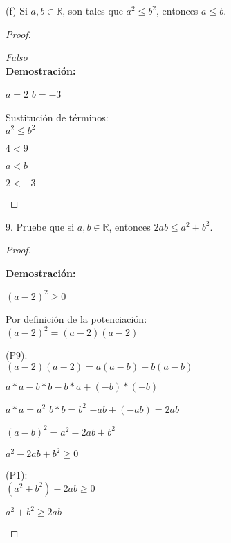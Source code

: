 \documentclass[12pt, a4paper]{article}
\begin{document}
(f) Si $a,b \in \mathbb{R}$, son tales que $a^2 \leq b^2$, entonces $a \leq b$.
    \begin{proof}
        \begin{center}
            \textit{Falso}\\
            \textbf{Demostración:}

            $a = 2$ $b = -3$

            Sustitución de términos:\\
            $a^2 \leq b^2$

            $4<9$

            $a<b$  
            
            $2<-3$

        \end{center}
    \end{proof}
9. Pruebe que si $a,b \in \mathbb{R}$, entonces $2ab \leq a^2 + b^2$.
    \begin{proof}
        \begin{center}
            \textbf{Demostración:}

            $(a-2)^2\geq0$

            Por definición de la potenciación:\\
            $(a-2)^2=(a-2)(a-2)$

            (P9):\\
            $(a-2)(a-2)=a(a-b)-b(a-b)$

            $a*a-b*b-b*a+(-b)*(-b)$

            $a*a=a^2$ $b*b=b^2$ $-ab+(-ab)=2ab$

            ${(a-b)}^2=a^2-2ab+b^2$

            $a^2-2ab+b^2\geq0$

            (P1):\\

            $(a^2+b^2)-2ab\geq0$

            $a^2+b^2\geq2ab$

        \end{center}
    \end{proof}
\end{document}
